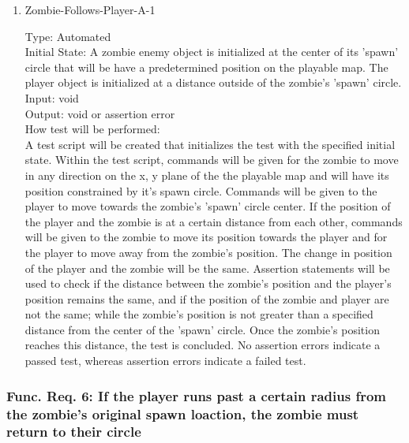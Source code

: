 \documentclass[12pt, titlepage]{article}
\begin{document}
\begin{enumerate}

\item{Zombie-Follows-Player-A-1\\}

Type: Automated\\
					
Initial State: A zombie enemy object is initialized at the center of its 'spawn' circle that will be have a predetermined position on the playable map. The player object is initialized at a distance outside of the zombie's 'spawn' circle.\\
					
Input: void \\
					
Output: void or assertion error \\
					
How test will be performed:\\ A test script will be created that initializes the test with the specified initial state. Within the test script, commands will be given for the zombie to move in any direction on the x, y plane of the the playable map and will have its position constrained by it's spawn circle. Commands will be given to the player to move towards the zombie's 'spawn' circle center. If the position of the player and the zombie is at a certain distance from each other, commands will be given to the zombie to move its position towards the player and for the player to move away from the zombie's position. The change in position of the player and the zombie will be the same. Assertion statements will be used to check if the distance between the zombie's position and the player's position remains the same, and if the position of the zombie and player are not the same; while the zombie's position is not greater than a specified distance from the center of the 'spawn' circle. Once the zombie's position reaches this distance, the test is concluded. No assertion errors indicate a passed test, whereas assertion errors indicate a failed test.\\

\end{enumerate}

\subsubsection{Func. Req. 6: If the player runs past a certain radius from the zombie's original spawn loaction, the zombie must return to their circle}
\end{document}
